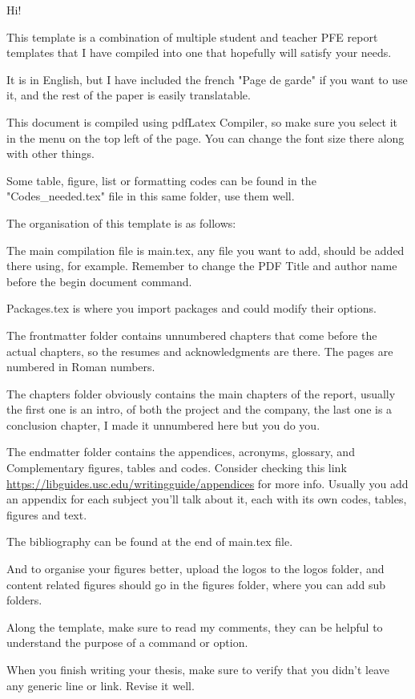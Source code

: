 Hi! 

This template is a combination of multiple student and teacher PFE report templates that I have compiled into one that hopefully will satisfy your needs.

It is in English, but I have included the french "Page de garde" if you want to use it, and the rest of the paper is easily translatable.

This document is compiled using pdfLatex Compiler, so make sure you select it in the menu on the top left of the page. You can change the font size there along with other things.

Some table, figure, list or formatting codes can be found in the "Codes\_needed.tex" file in this same folder, use them well.

The organisation of this template is as follows: 

The main compilation file is main.tex, any file you want to add, should be added there using,  for example. Remember to change the PDF Title and author name before the begin document command.

Packages.tex is where you import packages and could modify their options.

The frontmatter folder contains unnumbered chapters that come before the actual chapters, so the resumes and acknowledgments are there. The pages are numbered in Roman numbers.

The chapters folder obviously contains the main chapters of the report, usually the first one is an intro, of both the project and the company, the last one is a conclusion chapter, I made it unnumbered here but you do you.

The endmatter folder contains the appendices, acronyms, glossary, and Complementary figures, tables and codes. Consider checking this link \url{https://libguides.usc.edu/writingguide/appendices} for more info. Usually you add an appendix for each subject you'll talk about it, each with its own codes, tables, figures and text.

The bibliography can be found at the end of main.tex file.

And to organise your figures better, upload the logos to the logos folder, and content related figures should go in the figures folder, where you can add sub folders.

Along the template, make sure to read my comments, they can be helpful to understand the purpose of a command or option. 

When you finish writing your thesis, make sure to verify that you didn't leave any generic line or link. Revise it well.

